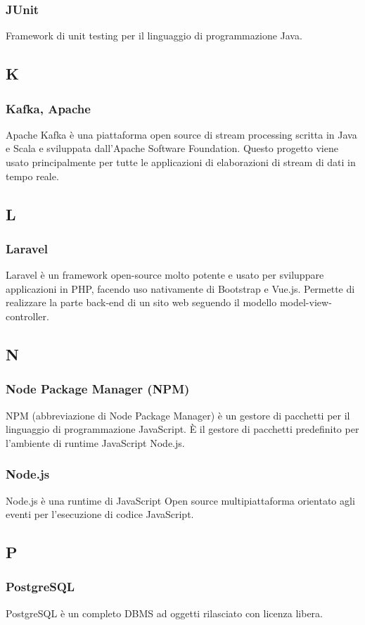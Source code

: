 \subsubsection{JUnit}
Framework di unit testing per il linguaggio di programmazione Java.
\subsection{K}
\subsubsection{Kafka, Apache}  Apache Kafka è una piattaforma open source di stream processing scritta in Java e Scala e sviluppata dall'Apache Software Foundation.  Questo progetto viene usato principalmente per tutte le applicazioni di elaborazioni di stream di dati in tempo reale.
\subsection{L}
\subsubsection{Laravel}  Laravel è un framework open-source molto potente e usato per sviluppare applicazioni in PHP, facendo uso nativamente di Bootstrap e Vue.js. Permette di realizzare la parte back-end di un sito web seguendo il modello model-view-controller. 
\subsection{N}
\subsubsection{Node Package Manager (NPM)}  NPM (abbreviazione di Node Package Manager) è un gestore di pacchetti per il linguaggio di programmazione JavaScript. È il gestore di pacchetti predefinito per l'ambiente di runtime JavaScript Node.js.
\subsubsection{Node.js}  Node.js è una runtime di JavaScript Open source multipiattaforma orientato agli eventi per l'esecuzione di codice JavaScript.
\subsection{P}
\subsubsection{PostgreSQL}  PostgreSQL è un completo DBMS ad oggetti rilasciato con licenza libera.
